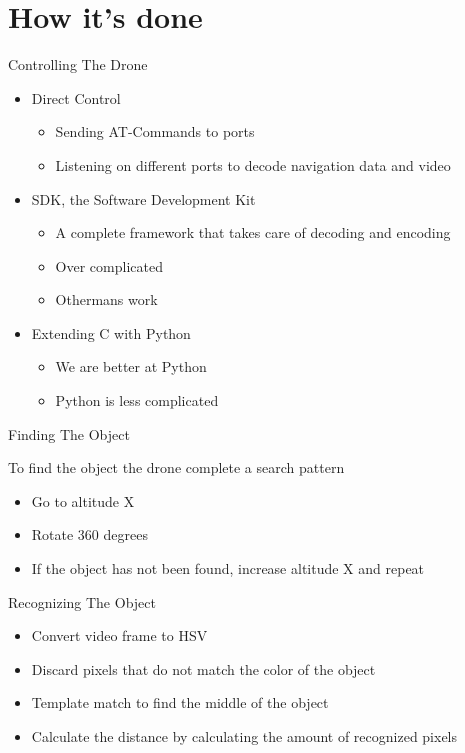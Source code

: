 \documentclass{beamer}
\newcommand{\slide}[2]
{
\begin{frame}
\begin{block}{#1} 

#2

\end{block} \end{frame}
}
\begin{document}
\section{How it's done}
\slide{Controlling The Drone}{
\begin{itemize}
    \item Direct Control
        \begin{itemize}
            \item Sending AT-Commands to ports
            \item Listening on different ports to decode navigation data and video
        \end{itemize}
    \item SDK, the Software Development Kit
        \begin{itemize}
            \item A complete framework that takes care of decoding and encoding
            \item Over complicated
            \item Othermans work
        \end{itemize}
    \item Extending C with Python
        \begin{itemize}
            \item We are better at Python
            \item Python is less complicated 
        \end{itemize}
\end{itemize}
}

\slide{Finding The Object}{
To find the object the drone complete a search pattern
\begin{itemize}
    \item Go to altitude X
    \item Rotate 360 degrees
    \item If the object has not been found, increase altitude X and repeat
\end{itemize}
}

\slide{Recognizing The Object}{
\begin{itemize}
    \item Convert video frame to HSV
    \item Discard pixels that do not match the color of the object
    \item Template match to find the middle of the object
    \item Calculate the distance by calculating the amount of recognized pixels
\end{itemize}
}
\end{document}
